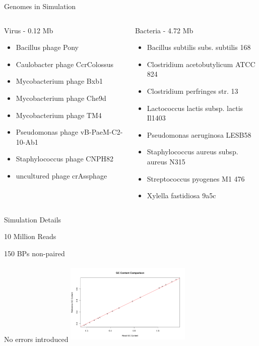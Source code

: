 \documentclass[11pt]{beamer}
\begin{document}
	\begin{frame}{Genomes in Simulation}
	\begin{columns}
			\begin{block}{Virus - 0.12 Mb}
			\begin{itemize}
			\item Bacillus phage Pony
			\item Caulobacter phage CcrColossus
			\item Mycobacterium phage Bxb1
			\item Mycobacterium phage Che9d
			\item Mycobacterium phage TM4
			\item Pseudomonas phage vB-PaeM-C2-10-Ab1
			\item Staphylococcus phage CNPH82
			\item uncultured phage crAssphage
			\end{itemize}
			\end{block}	
			\begin{block}{Bacteria - 4.72 Mb}
			\begin{itemize}
			\item Bacillus subtilis subs. subtilis 168
			\item Clostridium acetobutylicum ATCC 824
			\item Clostridium perfringes str. 13
			\item Lactococcus lactis subsp. lactis Il1403
			\item Pseudomonas aeruginosa LESB58
			\item Staphylococcus aureus subsp. aureus N315
			\item Streptococcus pyogenes M1 476
			\item Xylella fastidiosa 9a5c
			\end{itemize}
			\end{block}
	\end{columns}
	\end{frame}
	
	\begin{frame}{Simulation Details}
	\begin{description}
	\item[Library Size] 10 Million Reads
	\item[Insert Size] 150 BPs non-paired
	\item[Error Rate] No errors introduced
	\vspace{.5cm}
	\includegraphics[height=4cm, width=6cm]{GC_Comparison.png} 
	\end{description}
	\end{frame}
	
\end{document}
